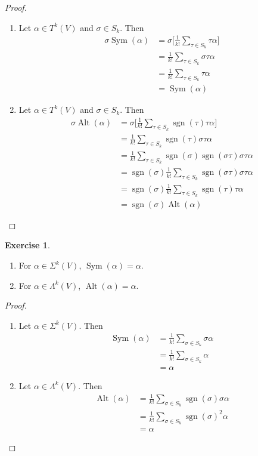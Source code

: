 \documentclass{book}
\theoremstyle{definition}
\newtheorem{ex}[definition]{Exercise}
\newcommand{\al}{\alpha}
\newcommand{\sig}{\sigma}
\newcommand{\Lam}{\Lambda}
\newcommand{\Sig}{\Sigma}
\DeclareMathOperator{\sgn}{sgn}
\DeclareMathOperator{\Sym}{Sym}
\DeclareMathOperator{\Alt}{Alt}
\DeclareMathOperator*{\0}{\mbf{0}}
\DeclareMathOperator*{\1}{\mbf{1}}
\begin{document}
	\begin{proof}\
		\begin{enumerate}
			\item Let $\al \in T^k(V)$ and $\sig \in S_k$. Then 
			\begin{align*}
				\sig \Sym(\al) 
				&= \sig \bigg[ \frac{1}{k!}\sum_{\tau \in S_k} \tau \al \bigg]\\
				&= \frac{1}{k!} \sum_{\tau \in S_k} \sig \tau \al \\
				&= \frac{1}{k!} \sum_{\tau \in S_k} \tau \al \\
				&= \Sym(\al)
			\end{align*} 
			\item Let $\al \in T^k(V)$ and $\sig \in S_k$. Then 
			\begin{align*}
				\sig \Alt(\al) 
				&= \sig \bigg[ \frac{1}{k!}\sum_{\tau \in S_k} \sgn(\tau)\tau \al \bigg] \\
				&= \frac{1}{k!}\sum_{\tau \in S_k} \sgn(\tau) \sig \tau \al \\
				&= \frac{1}{k!} \sum_{\tau \in S_k} \sgn(\sig) \sgn(\sig \tau) \sig \tau \al \\
				&= \sgn(\sig) \frac{1}{k!} \sum_{\tau \in S_k} \sgn(\sig \tau) \sig \tau \al \\
				&= \sgn(\sig) \frac{1}{k!} \sum_{\tau \in S_k} \sgn(\tau)\tau \al \\
				&= \sgn(\sig)\Alt(\al)
			\end{align*} 
		\end{enumerate}
	\end{proof}

	\begin{ex} \
		\begin{enumerate}
			\item For $\al \in \Sig^k(V)$, $\Sym(\al) = \al$.
			\item For $\al \in \Lam^k(V)$, $\Alt(\al) = \al$.
		\end{enumerate}
	\end{ex}

	\begin{proof}\
		\begin{enumerate}
			\item Let $\al \in \Sig^k(V)$. Then 
			\begin{align*}
				\Sym(\al) 
				&= \frac{1}{k!} \sum_{\sig \in S_k} \sig \al \\
				&= \frac{1}{k!} \sum_{\sig \in S_k} \al \\
				&= \al
			\end{align*}
			\item Let $\al \in \Lam^k(V)$. Then 
			\begin{align*}
				\Alt(\al) 
				&= \frac{1}{k!} \sum_{\sig \in S_k} \sgn(\sig)\sig \al \\
				&= \frac{1}{k!} \sum_{\sig \in S_k} \sgn(\sig)^2 \al \\
				&= \al
			\end{align*}
		\end{enumerate}
	\end{proof}
\end{document}
